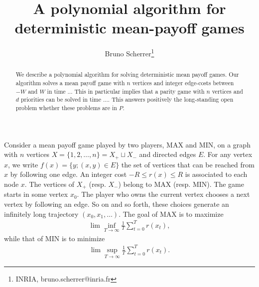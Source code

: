 \documentclass{article}
\title{A polynomial algorithm for deterministic mean-payoff games}
\author{Bruno Scherrer\footnote{INRIA, bruno.scherrer@inria.fr}}
\def\Xmax{X_{+}}
\def\Xmin{X_{-}}
\newcommand{\suc}[1]{f(#1)}
\begin{document}
\maketitle

\begin{abstract}
  We describe a polynomial algorithm for solving deterministic mean payoff games. Our algorithm solves a mean payoff game with $n$ vertices and integer edge-costs between $-W$ and $W$ in time ... This in particular implies that a parity game with $n$ vertices and $d$ priorities can be solved in time .... This answers positively the long-standing open problem whether these problems are in $P$.
\end{abstract}



Consider a mean payoff game played by two players, MAX and MIN, on a graph with $n$ vertices $X=\{1,2,\dots,n\}=\Xmax \sqcup \Xmin$ and directed edges $E$. For any vertex $x$, we write $\suc{x}=\{y;(x,y) \in E\}$ the set of vertices that can be reached from $x$ by following one edge. An integer cost $-R \le r(x) \le R$ is associated to each node $x$. The vertices of $\Xmax$ (resp. $\Xmin$) belong to MAX (resp. MIN). The game starts in some vertex $x_0$. The player who owns the current vertex chooses a next vertex by following an edge. So on and so forth, these choices generate an infinitely long trajectory $(x_0,x_1,\dots)$. The goal of MAX is to maximize
\begin{align}
\lim\inf_{T \to \infty} \frac 1 T \sum_{t=0}^{T}  r(x_t),
\end{align}
while that of MIN is to minimize
\begin{align}
\lim\sup_{T \to \infty} \frac 1 T \sum_{t=0}^{T}  r(x_t).
\end{align}
\end{document}
